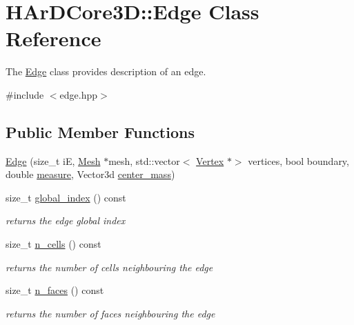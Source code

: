 \hypertarget{classHArDCore3D_1_1Edge}{}\section{H\+Ar\+D\+Core3D\+:\+:Edge Class Reference}
\label{classHArDCore3D_1_1Edge}


The \hyperlink{classHArDCore3D_1_1Edge}{Edge} class provides description of an edge.  




{\ttfamily \#include $<$edge.\+hpp$>$}

\subsection*{Public Member Functions}
\begin{DoxyCompactItemize}
\item 
\hyperlink{classHArDCore3D_1_1Edge_a051ae1dd47537d89d8efbce3d4fd1760}{Edge} (size\+\_\+t iE, \hyperlink{classHArDCore3D_1_1Mesh}{Mesh} $\ast$mesh, std\+::vector$<$ \hyperlink{classHArDCore3D_1_1Vertex}{Vertex} $\ast$$>$ vertices, bool boundary, double \hyperlink{group__Mesh_ga38609361fcb95fa62e0bf2d5170144aa}{measure}, Vector3d \hyperlink{group__Mesh_gac7aee988662d982ab3fd81704af7842c}{center\+\_\+mass})
\item 
size\+\_\+t \hyperlink{group__Mesh_ga7460c422a7e7ed1a59bc930054551f68}{global\+\_\+index} () const
\begin{DoxyCompactList}\small\item\em returns the edge global index \end{DoxyCompactList}\item 
size\+\_\+t \hyperlink{group__Mesh_gabe29c7660cf7a1dddb06b876ebc76f80}{n\+\_\+cells} () const
\begin{DoxyCompactList}\small\item\em returns the number of cells neighbouring the edge \end{DoxyCompactList}\item 
size\+\_\+t \hyperlink{group__Mesh_gaab36400cd966cbeec90297f41c14ac55}{n\+\_\+faces} () const
\begin{DoxyCompactList}\small\item\em returns the number of faces neighbouring the edge \end{DoxyCompactList}\item 
\mbox{\label{classHArDCore3D_1_1Edge_a72bedde2003c68d015c70326924b6d7f}} 
$$
\end{DoxyCompactItemize}
